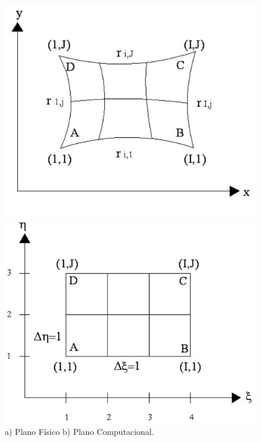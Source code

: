 \documentclass[11pt,letterpaper]{article}
\begin{document}
\begin{figure}[H]
	\begin{minipage}{.49\linewidth}
		\centering
		\includegraphics[scale=0.31]{./imgs/planoFisico.jpg}
	\end{minipage}
	\begin{minipage}{.49\linewidth}
		\centering
		\includegraphics[scale=0.31]{./imgs/planoComputacional.jpg}
	\end{minipage}
	\caption{a) Plano F\'isico b) Plano Computacional.}
\end{figure}
\end{document}
